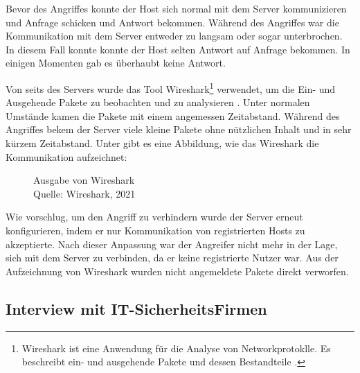 Bevor des Angriffes konnte der Host sich normal mit dem Server kommunizieren und Anfrage schicken und Antwort bekommen.
Während des Angriffes war die Kommunikation mit dem Server entweder zu langsam oder sogar unterbrochen. In diesem Fall
konnte konnte der Host selten Antwort auf Anfrage bekommen. In einigen Momenten gab es überhaubt keine Antwort. 

Von seits des Servers wurde das Tool Wireshark\footnote{Wireshark ist eine Anwendung für die Analyse von Networkprotoklle.
Es beschreibt ein- und ausgehende Pakete und dessen Bestandteile \cite{refst:wisa}.} verwendet, um die Ein- und Ausgehende
Pakete zu beobachten und zu analysieren \cite{refart:UBEC}. Unter normalen Umstände kamen die Pakete mit einem angemessen
Zeitabstand. Während des Angriffes bekem der Server viele kleine Pakete ohne nützlichen Inhalt und in sehr kürzem Zeitabstand.
Unter gibt es eine Abbildung, wie das Wireshark die Kommunikation aufzeichnet:

\begin{figure}[H]
  \caption{Ausgabe von Wireshark \\Quelle: Wireshark, 2021}
  \label{fig:refst_wisa}
\end{figure}

Wie \cite{refip:NYRS} vorschlug, um den Angriff zu verhindern wurde der Server erneut konfigurieren, indem er nur
Kommunikation von registrierten Hosts zu akzeptierte. Nach dieser Anpassung war der Angreifer nicht mehr in der Lage, 
sich mit dem Server zu verbinden, da er keine registrierte Nutzer war. Aus der Aufzeichnung von Wireshark wurden nicht 
angemeldete Pakete direkt verworfen.

\subsection{Interview mit IT-SicherheitsFirmen}

